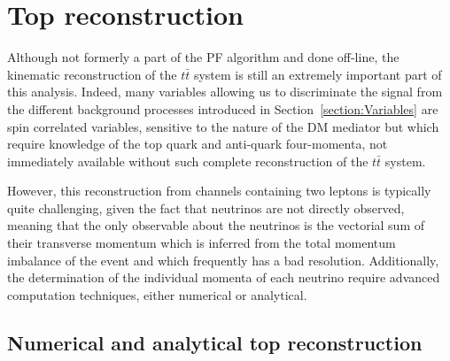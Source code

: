 \documentclass[a4paper, 10pt, openright]{report}
\begin{document}
\section{Top reconstruction} \label{section:RecoTop}

Although not formerly a part of the \ac{PF} algorithm and done off-line, the kinematic reconstruction of the $t \bar t$ system is still an extremely important part of this analysis. Indeed, many variables allowing us to discriminate the signal from the different background processes introduced in Section~\ref{section:Variables} are spin correlated variables, sensitive to the nature of the \ac{DM} mediator but which require knowledge of the top quark and anti-quark four-momenta, not immediately available without such complete reconstruction of the $t \bar t$ system. 

However, this reconstruction from channels containing two leptons is typically quite challenging, given the fact that neutrinos are not directly observed, meaning that the only observable about the neutrinos is the vectorial sum of their transverse momentum which is inferred from the total momentum imbalance of the event and which frequently has a bad resolution. Additionally, the determination of the individual momenta of each neutrino require advanced computation techniques, either numerical or analytical.

\subsection{Numerical and analytical top reconstruction}
\end{document}
